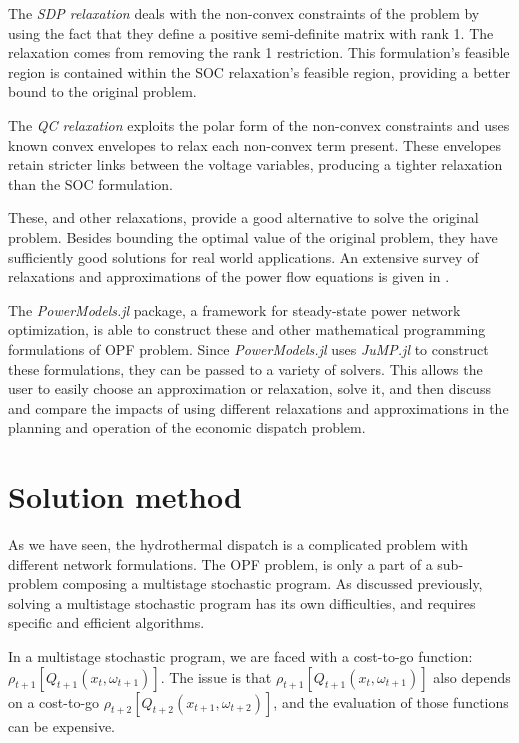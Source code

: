 \documentclass{juliacon}
\begin{document}
The \textit{SDP relaxation} deals with the non-convex constraints of the problem by using the fact that they define a positive semi-definite matrix with rank 1. The relaxation comes from removing the rank 1 restriction. This formulation's feasible region is contained within the SOC relaxation's feasible region, providing a better bound to the original problem. 

The \textit{QC relaxation} exploits the polar form of the non-convex constraints and uses known convex envelopes to relax each non-convex term present. These envelopes retain stricter links between the voltage variables, producing a tighter relaxation than the SOC formulation.

These, and other relaxations, provide a good alternative to solve the original problem. Besides bounding the optimal value of the original problem, they have sufficiently good solutions for real world applications. An extensive survey of relaxations and approximations of the power flow equations is given in \cite{molzahn2019survey}. 

The \textit{PowerModels.jl} package, a framework for steady-state power network optimization, is able to construct these and other mathematical programming formulations of OPF problem. Since \textit{PowerModels.jl} uses \textit{JuMP.jl} to construct these formulations, they can be passed to a variety of solvers. This allows the user to easily choose an approximation or relaxation, solve it, and then discuss and compare the impacts of using different relaxations and approximations in the planning and operation of the economic dispatch problem.

\section{Solution method}
\label{sec:sddp}

As we have seen, the hydrothermal dispatch is a complicated problem with different network formulations. The OPF problem, is only a part of a sub-problem composing a multistage stochastic program. As discussed previously, solving a multistage stochastic program has its own difficulties, and requires specific and efficient algorithms.

In a multistage stochastic program, we are faced with a cost-to-go function: $\rho_{t+1}[Q_{t+1}(x_{t}, \omega_{t+1})]$. The issue is that $\rho_{t+1}[Q_{t+1}(x_{t}, \omega_{t+1})]$ also depends on a cost-to-go $\rho_{t+2}[Q_{t+2}(x_{t+1}, \omega_{t+2})]$, and the evaluation of those functions can be expensive.
\end{document}
